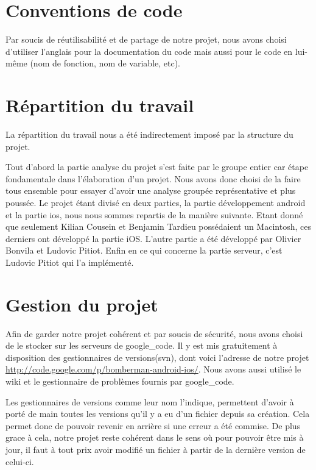 \section{Conventions de code}
	Par soucis de réutilisabilité et de partage de notre projet, 
	nous avons choisi d'utiliser l'anglais pour la documentation du code mais aussi 
	pour le code en lui-même (nom de fonction, nom de variable, etc).


\section{Répartition du travail}
	La répartition du travail nous a été indirectement imposé par la structure du projet. 
	
	Tout d'abord la partie analyse du projet s'est faite par le groupe entier car
	étape fondamentale dans l'élaboration d'un projet. Nous avons donc choisi de
	la faire tous ensemble pour essayer d'avoir une analyse groupée représentative
	et plus poussée. 
	Le projet étant divisé en deux parties, la partie développement \gls{android}
	et la partie \gls{ios}, nous nous sommes repartis de la manière suivante.
	Etant donné que seulement Kilian Cousein et Benjamin Tardieu possédaient un
	Macintosh, ces derniers ont développé la partie iOS. L'autre partie a été
	développé par Olivier Bonvila et Ludovic Pitiot. 
	Enfin en ce qui concerne la partie serveur, c'est Ludovic Pitiot qui l'a implémenté.
	
	
\section{Gestion du projet}
	Afin de garder notre projet cohérent et par soucis de sécurité, nous avons
	choisi de le stocker sur les serveurs de \gls{google_code}. Il y est mis
	gratuitement à disposition des gestionnaires de versions(\gls{svn}), dont voici
	l'adresse de notre projet \url{http://code.google.com/p/bomberman-android-ios/}. 
	Nous avons aussi utilisé le wiki et le gestionnaire de problèmes fournis par
	\gls{google_code}.
	
	Les gestionnaires de versions comme leur nom l'indique, permettent d'avoir à
	porté de main toutes les versions qu'il y a eu d'un fichier depuis sa
	création. Cela permet donc de pouvoir revenir en arrière si une erreur a été
	commise. De plus grace à cela, notre projet reste cohérent dans le sens où
	pour pouvoir être mis à jour, il faut à tout prix avoir modifié un fichier à
	partir de la dernière version de celui-ci.
		
